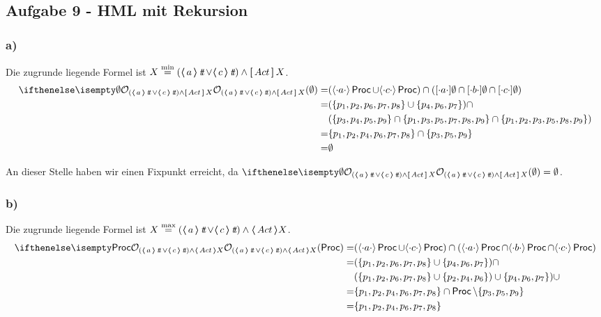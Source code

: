 \subsection*{Aufgabe 9 - HML mit Rekursion}

\subsubsection*{a)}

Die zugrunde liegende Formel ist
$ X \stackrel{\operatorname{min}}{=} ( \boldsymbol{\langle} \, a \, \boldsymbol{\rangle} \mathop{\textit{t}\!\textit{t}} \lor \boldsymbol{\langle} \, c \, \boldsymbol{\rangle} \mathop{\textit{t}\!\textit{t}} ) \land \boldsymbol{[} \, Act \, \boldsymbol{]}\, X $. \\

\begin{align*}
\OSem{ (\poss{a} \true \lor \poss{c} \true ) \land \necess{Act} X }{\emptyset}
=& ( \possDenot{a} \Proc \cup \possDenot{c}\Proc) \cap
 (\necessDenot{a}\emptyset \cap \necessDenot{b} \emptyset \cap \necessDenot{c} \emptyset)\\
=& (\{ p_1, p_2, p_6, p_7, p_8 \} \cup \{p_4, p_6, p_7\}) \cap\\
  &( \{p_3, p_4, p_5, p_9 \} \cap
  \{p_1, p_3, p_5, p_7, p_8, p_9 \} \cap
  \{p_1, p_2, p_3, p_5, p_8, p_9 \}) \\
=& \{p_1, p_2, p_4, p_6, p_7, p_8 \} \cap \{ p_3, p_5, p_9 \} \\
=& \emptyset
\end{align*}

An dieser Stelle haben wir einen Fixpunkt erreicht, da
$ \OSem {(\poss {a} \true \lor \poss{c} \true ) \land \necess {Act} X }{\emptyset} = \emptyset $.


\subsubsection*{b)}

Die zugrunde liegende Formel ist
$ X \stackrel{\operatorname{max}}{=} ( \boldsymbol{\langle} \, a \, \boldsymbol{\rangle} \mathop{\textit{t}\!\textit{t}} \lor \boldsymbol{\langle} \, c \, \boldsymbol{\rangle} \mathop{\textit{t}\!\textit{t}} ) \land \boldsymbol{\langle} \, Act \, \boldsymbol{\rangle} X $. \\

\begin{align*}
\OSem{ (\poss{a} \true \lor \poss{c} \true ) \land \poss{Act} X }{\Proc}
=& ( \possDenot{a} \Proc \cup \possDenot{c}\Proc) \cap
 (\possDenot{a}\Proc \cap \possDenot{b} \Proc \cap \possDenot{c} \Proc)\\
=& (\{ p_1, p_2, p_6, p_7, p_8 \} \cup \{p_4, p_6, p_7\}) \cap\\
  &(\{ p_1, p_2, p_6, p_7, p_8 \} \cup
   \{p_2, p_4, p_6\}) \cup
   \{p_4, p_6, p_7\}) \cup\\
=& \{p_1, p_2, p_4, p_6, p_7, p_8 \} \cap \Proc \setminus \{ p_3, p_5, p_9 \} \\
=& \{p_1, p_2, p_4, p_6, p_7, p_8 \}
\end{align*}

